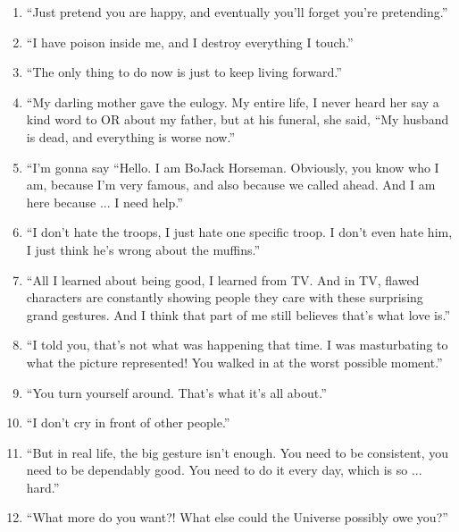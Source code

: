 \documentclass{book}
\numberwithin{equation}{section}
\begin{document}
\begin{enumerate}
    \item ``Just pretend you are happy, and eventually you'll forget you're pretending.''
    \item ``I have poison inside me, and I destroy everything I touch.''
    \item ``The only thing to do now is just to keep living forward.''
    \item ``My darling mother gave the eulogy. My entire life, I never heard her say a kind word to OR about my father, but at his funeral, she said, ``My husband is dead, and everything is worse now.''
    \item ``I'm gonna say ``Hello. I am BoJack Horseman. Obviously, you know who I am, because I'm very famous, and also because we called ahead. And I am here because ... I need help.''
    \item ``I don't hate the troops, I just hate one specific troop. I don't even hate him, I just think he's wrong about the muffins.''
    \item ``All I learned about being good, I learned from TV. And in TV, flawed characters are constantly showing people they care with these surprising grand gestures. And I think that part of me still believes that's what love is.''
    \item ``I told you, that's not what was happening that time. I was masturbating to what the picture represented! You walked in at the worst possible moment.''
    \item ``You turn yourself around. That's what it's all about.''
    \item ``I don't cry in front of other people.''
    \item ``But in real life, the big gesture isn't enough. You need to be consistent, you need to be dependably good. You need to do it every day, which is so ... hard.''
    \item ``What more do you want?! What else could the Universe possibly owe you?''
\end{enumerate}
\end{document}
